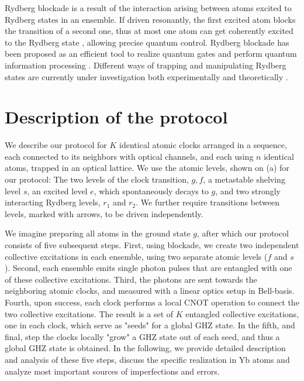 Rydberg blockade is a result of the interaction arising between atoms excited to
Rydberg states in an ensemble. If driven resonantly, the first excited atom
blocks the transition of a second one, thus at most one atom can get coherently
excited to the Rydberg state \cite{Dudin2012, Dudin2010, Ebert2015}, allowing
precise quantum control. Rydberg blockade has been proposed as an efficient tool
to realize quantum gates and perform quantum information processing
\cite{Lukin2001, Muller2009, Saffman2010, Zhao2010, Han2010, Goerz2014}.
Different ways of trapping and manipulating Rydberg states are currently  under
investigation both  experimentally \cite{Chen2010, Bariani2012,
Firstenberg2013, Antezza2014, Weber2015} and theoretically \cite{Topcu2013,
Beterov2013, Topcu2014}.



\section{Description of the protocol}

We describe our protocol for $K$ identical atomic clocks arranged in a sequence,
each connected to its neighbors with optical channels, and each using $n$
identical atoms, trapped in an optical lattice.
We use the atomic levels, shown on (a) for our protocol:
The two levels of the clock transition, $g, f$, a metastable shelving level $s$, an
excited level $e$, which spontaneously decays to $g$, and two strongly
interacting Rydberg levels, $r_1$ and $r_2$.
We further require transitions between levels, marked with arrows, to be driven
independently.

We imagine preparing all atoms in the ground state $g$, after which
our protocol consists of five subsequent steps.
First, using blockade, we create two independent collective excitations in
each ensemble, using two separate atomic levels ($f$ and $s$).
Second, each ensemble emits single photon pulses that are entangled with one of these
collective excitations.
Third, the photons are sent towards the neighboring atomic clocks, and measured
with a linear optics setup in Bell-basis. Fourth, upon success, each clock
performs a local CNOT operation to connect the two collective excitations. The
result is a set of $K$ entangled collective excitations, one in each clock,
which serve as "seeds" for a global GHZ state.
In the fifth, and final, step the clocks locally "grow" a GHZ state out of each
seed, and thus a global GHZ state is obtained. In the following, we provide detailed description and analysis of these five steps, discuss the specific realization in Yb atoms and analyze most important sources of imperfections and errors. 




